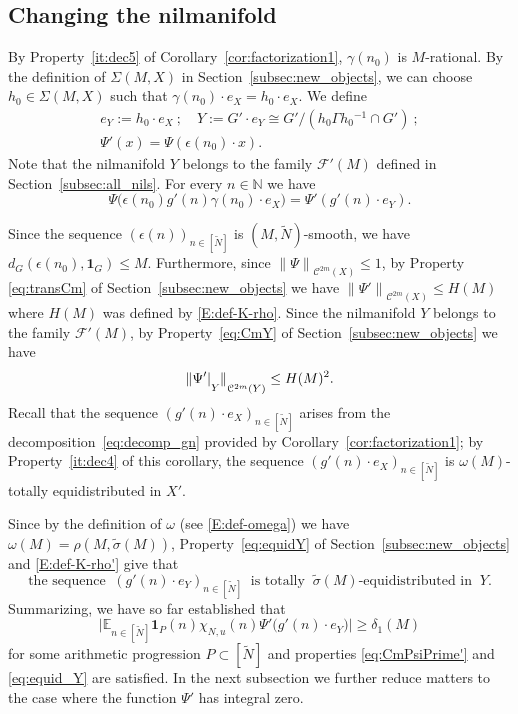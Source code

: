\documentclass[11pt]{amsart}
\theoremstyle{definition}
\begin{document}
\subsection{Changing the nilmanifold}
By Property~\eqref{it:dec5} of Corollary~\ref{cor:factorization1},
$\gamma(n_0)$ is $M$-rational. By the definition of   $\Sigma(M,X)$
in Section~\ref{subsec:new_objects}, we can choose $h_0\in
\Sigma(M,X)$ such that $\gamma(n_0)\cdot e_X=h_0\cdot e_X$. We
define
\begin{gather*}
e_Y:=h_0\cdot e_X\  ;\quad
Y:=G'\cdot e_Y\cong G'/(h_0\Gamma h_0{^{-1}}\cap G')\ ;\\
\Psi'(x)= \Psi(\epsilon(n_0)\cdot x).
\end{gather*}
Note that the nilmanifold $Y$ belongs to the family ${{\mathcal F}}'(M)$
defined in Section~\ref{subsec:all_nils}. For every $n\in {{\mathbb N}}$ we
have
\begin{equation}
\label{eq:Psisecond} \Psi\bigl(\epsilon(n_0)g'(n)\gamma(n_0)\cdot
e_X\bigr)=\Psi'(g'(n)\cdot e_Y).
\end{equation}

Since the sequence $(\epsilon(n))_{n\in [{{\widetilde N}}]}$ is $(M,{{\widetilde N}})$-smooth,
we have $d_G(\epsilon(n_0),{\mathbf{1}}_G)\leq M$. Furthermore, since
${\lVert {\Psi} \rVert}_{{{\mathcal C}}^{2m}(X)}\leq 1$, by Property \eqref{eq:transCm} of
Section~\ref{subsec:new_objects} we have
${\lVert {\Psi'} \rVert}_{{{\mathcal C}}^{2m}(X)}\leq H(M)$ where $H(M)$ was defined by
\eqref{E:def-K-rho}. Since the nilmanifold $Y$
belongs to the family ${{\mathcal F}}'(M)$,
 by Property~\eqref{eq:CmY} of Section~\ref{subsec:new_objects}
 we have
\begin{equation}
\label{eq:CmPsiPrime'} {\lVert {\Psi'|\raise-2mm\hbox{$\scriptstyle
Y$}} \rVert}_{{{\mathcal C}}^{2m}(Y)}\leq H(M)^2.
\end{equation}
Recall that the sequence $(g'(n)\cdot e_X)_{n\in[{{\widetilde N}}]}$ arises from the
decomposition~\eqref{eq:decomp_gn} provided by Corollary~\ref{cor:factorization1}; by Property~\eqref{it:dec4} of this corollary,
 the sequence $(g'(n)\cdot e_X)_{n\in[{{\widetilde N}}]}$ is
$\omega(M)$-totally equidistributed in $X'$.

Since by the definition  of $\omega$ (see \eqref{E:def-omega}) we
have  $\omega(M)= \rho(M,\tilde{\sigma}(M))$,
Property~\eqref{eq:equidY} of Section~\ref{subsec:new_objects} and
\eqref{E:def-K-rho'}  give that
\begin{equation}
\label{eq:equid_Y} \text{the \  sequence }
\  (g'(n)\cdot e_Y)_{n\in
[{{\widetilde N}}]} \ \text{ is totally }\  \tilde{\sigma}(M)\text{-equidistributed in }\ Y.
\end{equation}
Summarizing, we have so far established that
\begin{equation}
\label{eq:bound2'} \bigl|{{\mathbb E}}_{n\in [{{\widetilde N}}]}{\mathbf{1}}_{P}(n)
\chi_{N,u}(n)\Psi'\bigl(g'(n)\cdot e_Y\bigr)\bigr|\geq \delta_1(M)
\end{equation}
for some arithmetic progression $P\subset [{{\widetilde N}}]$ and properties
\eqref{eq:CmPsiPrime'} and \eqref{eq:equid_Y} are satisfied. In the
next subsection we further reduce matters to the case where the function
$\Psi'$ has integral zero.
\end{document}
